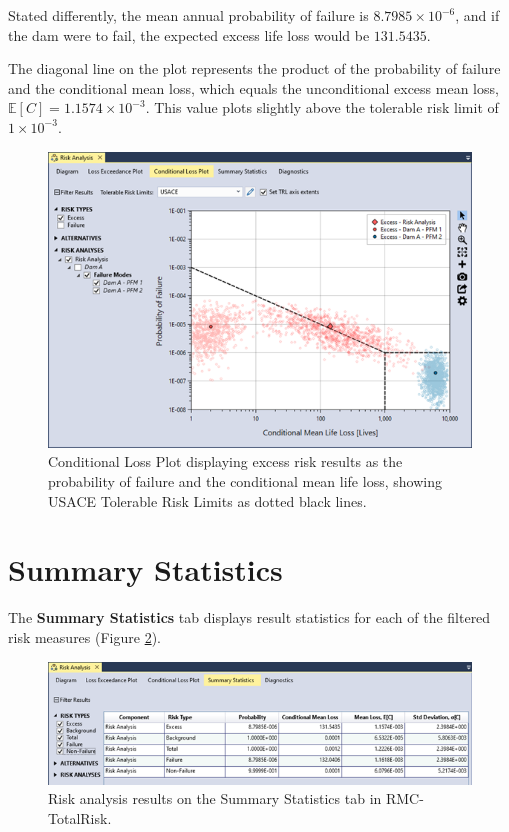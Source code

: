 \documentclass[
]{book}
\begin{document}
Stated differently, the mean annual probability of failure is \(8.7985\times10^{-6}\), and if the dam were to fail, the expected excess life loss would be \(131.5435\).

The diagonal line on the plot represents the product of the probability of failure and the conditional mean loss, which equals the unconditional excess mean loss, \(\mathbb{E}[C]=1.1574\times10^{-3}\). This value plots slightly above the tolerable risk limit of \(1\times10^{-3}\).

\begin{figure}

{\centering \includegraphics{images/figure141} 

}

\caption{Conditional Loss Plot displaying excess risk results as the probability of failure and the conditional mean life loss, showing USACE Tolerable Risk Limits as dotted black lines.}\label{fig:figure-141}
\end{figure}

\hypertarget{summary-statistics}{%
\section{Summary Statistics}\label{summary-statistics}}

The \textbf{Summary Statistics} tab displays result statistics for each of the filtered risk measures (Figure \ref{fig:figure-142}).

\begin{figure}

{\centering \includegraphics{images/figure142} 

}

\caption{Risk analysis results on the Summary Statistics tab in RMC-TotalRisk.}\label{fig:figure-142}
\end{figure}
\end{document}

